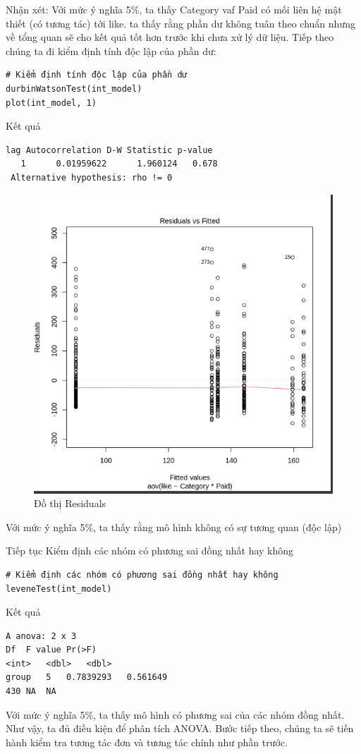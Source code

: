 \begin{itemize}
Nhận xét: Với mức ý nghĩa 5\%, ta thấy Category vaf Paid có mối liên hệ mật thiết (có tương tác)  tới like. ta thấy rằng phần dư không tuân theo chuẩn nhưng về tổng quan sẽ cho kết quả tốt hơn trước khi chưa xử lý dữ liệu.
\newpage
Tiếp theo chúng ta đi kiểm định tính độc lập của phần dư:
\begin{lstlisting}
# Kiểm định tính độc lập của phần dư
durbinWatsonTest(int_model)
plot(int_model, 1)
\end{lstlisting}
Kết quả
\begin{lstlisting}
lag Autocorrelation D-W Statistic p-value
   1      0.01959622      1.960124   0.678
 Alternative hypothesis: rho != 0
\end{lstlisting}
\begin{figure}[H]
    \centering
    \includegraphics[width=0.5\linewidth]{part23_figures/25.png}
    \caption{Đồ thị  Residuals}
    \label{fig:Đồ thị  Residuals}
\end{figure}

Với mức ý nghĩa 5\%, ta thấy rằng mô hình không có sự tương quan (độc lập)

Tiếp tục Kiểm định các nhóm có phương sai đồng nhất hay không

\begin{lstlisting}
# Kiểm định các nhóm có phương sai đồng nhất hay không
leveneTest(int_model)
\end{lstlisting}

Kết quả
\begin{lstlisting}
A anova: 2 x 3
Df	F value	Pr(>F)
<int>	<dbl>	<dbl>
group	5	0.7839293	0.561649
430	NA	NA

\end{lstlisting}

Với mức ý nghĩa 5\%, ta thấy mô hình có phương sai của các nhóm đồng nhất. Như vậy, ta đủ điều kiện để phân tích ANOVA. Bước tiếp theo, chúng ta sẽ tiến hành kiểm tra tương tác đơn và tương tác chính như phần trước.


\end{itemize}
